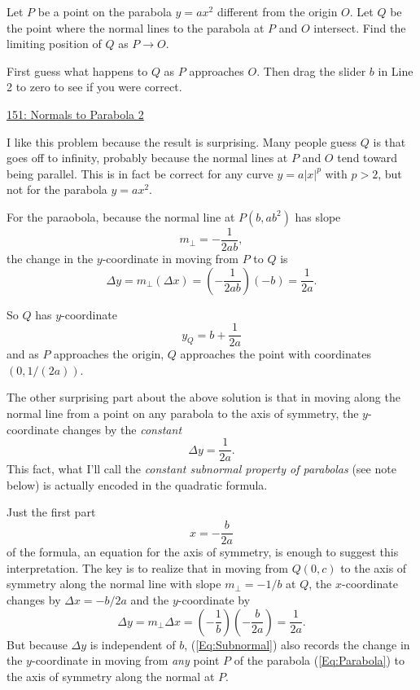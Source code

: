 \documentclass{ximera}
\begin{document}
\begin{exercise}
Let $P$ be a point on the parabola $y=ax^2$ different from the origin $O$. Let $Q$ be the point where the normal lines to the parabola at $P$ and $O$ intersect. Find the limiting position of $Q$ as $P\to O$.

\begin{exploration}
First guess what happens to $Q$ as $P$ approaches $O$. Then drag the slider $b$ in Line 2 to zero to see if you were correct.
\begin{onlineOnly}
    \begin{center}
\end{center}
\end{onlineOnly}

\href{https://www.desmos.com/calculator/4noszgo6dj}{151: Normals to Parabola 2}
\end{exploration}

\begin{explanation}
I like this problem because the result is surprising. Many people guess $Q$ is that goes off to infinity, probably because the normal lines at $P$ and $O$ tend toward being parallel. This is in fact be correct for any curve $y=a|x|^p$ with $p>2$, but not for the parabola $y=ax^2$.

For the paraobola, because the normal line at $P(b,ab^2)$ has slope
\[
        m_\perp = -\frac{1}{2ab} ,
\] 
the change in the $y$-coordinate in moving from $P$ to $Q$ is %
\[
 \Delta y =  m_\perp (\Delta x) =  \left( -\frac{1}{2ab}\right)(-b)  = \frac{1}{2a} .
\]

So $Q$ has $y$-coordinate
\[
     y_Q = b + \frac{1}{2a}
\]
and as $P$ approaches the origin, $Q$ approaches the point with coordinates $(0,1/(2a))$.
\end{explanation}
\end{exercise}

The other surprising part about the above solution is that in moving along the normal line from a point on any parabola to the axis of symmetry, the $y$-coordinate changes by the \emph{constant}
\[
   \Delta y = \frac{1}{2a} .
\]
This fact, what I'll call the \emph{constant subnormal property of parabolas} (see note below) is actually encoded in the quadratic formula. 

Just the first part 
\[
    x = -\frac{b}{2a}
\]
of the formula, an equation for the axis of symmetry, is enough to suggest this interpretation. The key is to realize that in moving from $Q(0,c)$ to the axis of symmetry along the normal line with slope $m_\perp = -1/b$ at $Q$, the $x$-coordinate changes by $\Delta x = -b/2a$ and the $y$-coordinate by
\begin{equation}
 \Delta y = m_\perp \Delta x = \left( -\frac{1}{b}\right) \left(- \frac{b}{2a}  \right)= \frac{1}{2a} .  \label{Eq:Subnormal}
\end{equation}
But because $\Delta y$ is independent of $b$, (\ref{Eq:Subnormal}) also records the change in the $y$-coordinate in moving from \emph{any} point $P$ of the parabola (\ref{Eq:Parabola}) to the axis of symmetry along the normal at $P$.
\end{document}
